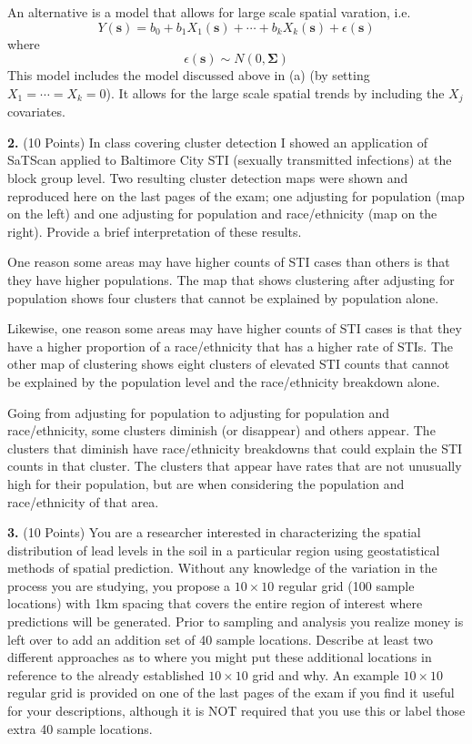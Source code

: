 \documentclass[letterpaper, 12pt]{article}
\begin{document}
{\sf
An alternative is a model that allows for large scale spatial varation, i.e.
\[
Y(\mathbf{s}) = b_0 + b_1 X_1(\mathbf{s}) + \cdots + b_k X_k(\mathbf{s})+ \epsilon(\mathbf{s})
\]
where 
\[
\epsilon(\mathbf{s}) \sim N(0, \boldsymbol{ \Sigma})
\]
This model includes the model discussed above in (a) (by setting $X_1 = \cdots = X_k = 0$). It allows for the large scale spatial trends by including the $X_j$ covariates.
}

\textbf{2.} (10 Points)
In class covering cluster detection I showed an application of SaTScan applied to Baltimore City STI (sexually transmitted infections) at the block group level. Two resulting cluster detection maps were shown and reproduced here on the last pages of the exam; one adjusting for population (map on the left) and one adjusting for population and race/ethnicity (map on the right). Provide a brief interpretation of these results.

{\sf
One reason some areas may have higher counts of STI cases than others is that they have higher populations.
The map that shows clustering after adjusting for population shows four clusters that cannot be explained by population alone.

Likewise, one reason some areas may have higher counts of STI cases is that they have a higher proportion of a race/ethnicity that has a higher rate of STIs. The other map of clustering shows eight clusters of elevated STI counts that cannot be explained by the population level and the race/ethnicity breakdown alone.

Going from adjusting for population to adjusting for population and race/ethnicity, some clusters diminish (or disappear) and others appear. The clusters that diminish have race/ethnicity breakdowns that could explain the STI counts in that cluster. The clusters that appear have rates that are not unusually high for their population, but are when considering the population and race/ethnicity of that area.
}

\textbf{3.} (10 Points)
You are a researcher interested in characterizing the spatial distribution of lead levels in the soil in a particular region using geostatistical methods of spatial prediction. Without any knowledge of the variation in the process you are studying, you propose a $10 \times 10$ regular grid (100 sample locations) with 1km spacing that covers the entire region of interest where predictions will be generated. Prior to sampling and analysis you realize money is left over to add an addition set of 40 sample locations. Describe at least two different approaches as to where you might put these additional locations in reference to the already established $10 \times 10$ grid and why. An example $10 \times 10$ regular grid is provided on one of the last pages of the exam if you find it useful for your descriptions, although it is NOT required that you use this or label those extra 40 sample locations.
\end{document}

